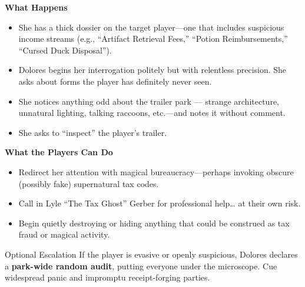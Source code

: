 \textbf{What Happens}
\begin{itemize}
    \item She has a thick dossier on the target player—one that includes suspicious income streams (e.g., “Artifact Retrieval Fees,” “Potion Reimbursements,” “Cursed Duck Disposal”).
    \item Dolores begins her interrogation politely but with relentless precision. She asks about forms the player has definitely never seen.
    \item She notices anything odd about the trailer park — strange architecture, unnatural lighting, talking raccoons, etc.—and notes it without comment.
    \item She asks to “inspect” the player’s trailer.
\end{itemize}

\textbf{What the Players Can Do}
\begin{itemize}
    \item Redirect her attention with magical bureaucracy—perhaps invoking obscure (possibly fake) supernatural tax codes.
    \item Call in Lyle “The Tax Ghost” Gerber for professional help… at their own risk.
    \item Begin quietly destroying or hiding anything that could be construed as tax fraud or magical activity.
\end{itemize}

\begin{CommentBox}{Optional Escalation}
    If the player is evasive or openly suspicious, Dolores declares a \textbf{park-wide random audit}, putting everyone under the microscope. Cue widespread panic and impromptu receipt-forging parties.
\end{CommentBox}

